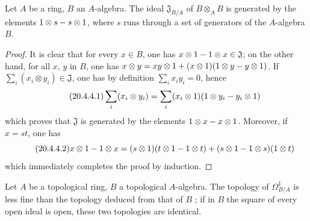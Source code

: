 \begin{lemma}[20.4.4]
\label{0.20.4.4}
Let $A$ be a ring, $B$ an $A$-algebra.
The ideal $\mathfrak{J}_{B/A}$ of $B\otimes_A B$ is generated by the elements $1\otimes s- s\otimes 1$, where $s$ runs through a set of generators of the $A$-algebra $B$.
\end{lemma}

\begin{proof}
It is clear that for every $x\in B$, one has $x\otimes 1- 1\otimes x\in\mathfrak{J}$; on the other hand, for all $x$, $y$ in $B$, one has $x\otimes y=xy\otimes 1+(x\otimes 1)(1\otimes y- y\otimes 1)$.
If $\sum_i (x_i\otimes y_i)\in\mathfrak{J}$, one has by definition $\sum_i x_i y_i=0$, hence
\begin{equation}
\tag{20.4.4.1}
  \label{0.20.4.4.1}
  \sum_i (x_i\otimes y_i) = \sum_i (x_i\otimes 1)(1\otimes y_i- y_i\otimes 1)
\end{equation}
which proves that $\mathfrak{J}$ is generated by the elements $1\otimes x- x\otimes 1$.
Moreover, if $x=st$, one has
\begin{equation}
\tag{20.4.4.2}
  \label{0.20.4.4.2}
  x\otimes 1- 1\otimes x = (s\otimes 1)(t\otimes 1- 1\otimes t)+(s\otimes 1- 1\otimes s)(1\otimes t)
\end{equation}
which immediately completes the proof by induction.
\end{proof}

\begin{proposition}[20.4.5]
\label{0.20.4.5}
Let $A$ be a topological ring, $B$ a topological $A$-algebra.
The topology of $\Omega^1_{B/A}$ is less fine than the topology deduced from that of $B$ ; if in $B$ the square of every open ideal is open, these two topologies are identical.
\end{proposition}

